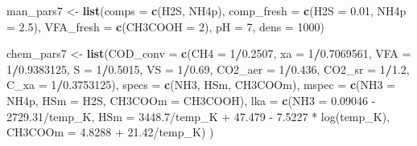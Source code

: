 \documentclass[
]{article}
\newenvironment{Shaded}{\begin{snugshade}}{\end{snugshade}}
\newcommand{\AttributeTok}[1]{\textcolor[rgb]{0.13,0.29,0.53}{#1}}
\newcommand{\DecValTok}[1]{\textcolor[rgb]{0.00,0.00,0.81}{#1}}
\newcommand{\FloatTok}[1]{\textcolor[rgb]{0.00,0.00,0.81}{#1}}
\newcommand{\FunctionTok}[1]{\textcolor[rgb]{0.13,0.29,0.53}{\textbf{#1}}}
\newcommand{\NormalTok}[1]{#1}
\newcommand{\OtherTok}[1]{\textcolor[rgb]{0.56,0.35,0.01}{#1}}
\newcommand{\SpecialCharTok}[1]{\textcolor[rgb]{0.81,0.36,0.00}{\textbf{#1}}}
\newcommand{\StringTok}[1]{\textcolor[rgb]{0.31,0.60,0.02}{#1}}
\begin{document}
\begin{Shaded}
\begin{Highlighting}[]
\NormalTok{man\_pars7 }\OtherTok{\textless{}{-}} \FunctionTok{list}\NormalTok{(}\AttributeTok{comps =} \FunctionTok{c}\NormalTok{(}\StringTok{\textquotesingle{}H2S\textquotesingle{}}\NormalTok{, }\StringTok{\textquotesingle{}NH4p\textquotesingle{}}\NormalTok{),}
                 \AttributeTok{comp\_fresh =} \FunctionTok{c}\NormalTok{(}\AttributeTok{H2S =} \FloatTok{0.01}\NormalTok{, }\AttributeTok{NH4p =} \FloatTok{2.5}\NormalTok{), }
                 \AttributeTok{VFA\_fresh =} \FunctionTok{c}\NormalTok{(}\AttributeTok{CH3COOH =} \DecValTok{2}\NormalTok{),}
                 \AttributeTok{pH =} \DecValTok{7}\NormalTok{, }\AttributeTok{dens =} \DecValTok{1000}\NormalTok{)}

\NormalTok{chem\_pars7 }\OtherTok{\textless{}{-}} \FunctionTok{list}\NormalTok{(}\AttributeTok{COD\_conv =} \FunctionTok{c}\NormalTok{(}\AttributeTok{CH4 =} \DecValTok{1}\SpecialCharTok{/}\FloatTok{0.2507}\NormalTok{, }\AttributeTok{xa =} \DecValTok{1}\SpecialCharTok{/}\FloatTok{0.7069561}\NormalTok{,}
                               \AttributeTok{VFA =} \DecValTok{1}\SpecialCharTok{/}\FloatTok{0.9383125}\NormalTok{, }\AttributeTok{S =} \DecValTok{1}\SpecialCharTok{/}\FloatTok{0.5015}\NormalTok{, }\AttributeTok{VS =} \DecValTok{1}\SpecialCharTok{/}\FloatTok{0.69}\NormalTok{, }
                               \AttributeTok{CO2\_aer =} \DecValTok{1}\SpecialCharTok{/}\FloatTok{0.436}\NormalTok{, }\AttributeTok{CO2\_sr =} \DecValTok{1}\SpecialCharTok{/}\FloatTok{1.2}\NormalTok{, }
                               \AttributeTok{C\_xa =} \DecValTok{1}\SpecialCharTok{/}\FloatTok{0.3753125}\NormalTok{),}
                   \AttributeTok{specs =} \FunctionTok{c}\NormalTok{(}\StringTok{\textquotesingle{}NH3\textquotesingle{}}\NormalTok{, }\StringTok{\textquotesingle{}HSm\textquotesingle{}}\NormalTok{, }\StringTok{\textquotesingle{}CH3COOm\textquotesingle{}}\NormalTok{),}
                   \AttributeTok{mspec =} \FunctionTok{c}\NormalTok{(}\AttributeTok{NH3 =} \StringTok{\textquotesingle{}NH4p\textquotesingle{}}\NormalTok{, }\AttributeTok{HSm =} \StringTok{\textquotesingle{}H2S\textquotesingle{}}\NormalTok{, }\AttributeTok{CH3COOm =} \StringTok{\textquotesingle{}CH3COOH\textquotesingle{}}\NormalTok{),}
                   \AttributeTok{lka =} \FunctionTok{c}\NormalTok{(}\AttributeTok{NH3 =} \StringTok{\textquotesingle{}{-} 0.09046 {-} 2729.31/temp\_K\textquotesingle{}}\NormalTok{, }
                           \AttributeTok{HSm =} \StringTok{\textquotesingle{}{-} 3448.7/temp\_K + 47.479 {-} 7.5227 * log(temp\_K)\textquotesingle{}}\NormalTok{,}
                           \AttributeTok{CH3COOm =} \StringTok{\textquotesingle{}{-} 4.8288 + 21.42/temp\_K\textquotesingle{}}\NormalTok{)}
\NormalTok{)}
\end{Highlighting}
\end{Shaded}
\end{document}
